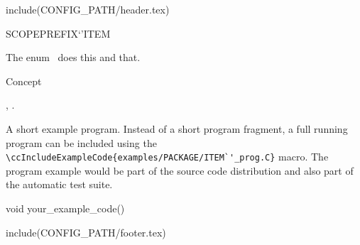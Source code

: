 include(CONFIG_PATH/header.tex)
\begin{ccRefEnum}SCOPE{PREFIX`'ITEM}  %


\ccDefinition
  
The enum \ccRefName\ does this and that.



\ccIsModel

Concept

\ccSeeAlso

,
.

\ccExample

A short example program.
Instead of a short program fragment, a full running program can be
included using the 
\verb|\ccIncludeExampleCode{examples/PACKAGE/ITEM`'_prog.C}| 
macro. The program example would be part of the source code distribution and
also part of the automatic test suite.

\begin{ccExampleCode}
void your_example_code() {
}
\end{ccExampleCode}


\end{ccRefEnum}

include(CONFIG_PATH/footer.tex)
